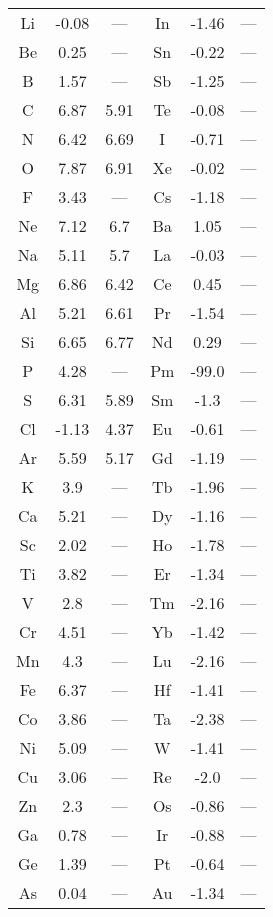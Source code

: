 \begin{table}
  \centering
  \begin{tabular}{c|cc||c|cc}
  Li & -0.08 & --- & In & -1.46 & --- \\
  Be & 0.25 & --- & Sn & -0.22 & --- \\
  B & 1.57 & --- & Sb & -1.25 & --- \\
  C & 6.87 & 5.91 & Te & -0.08 & --- \\
  N & 6.42 & 6.69 & I & -0.71 & --- \\
  O & 7.87 & 6.91 & Xe & -0.02 & --- \\
  F & 3.43 & --- & Cs & -1.18 & --- \\
  Ne & 7.12 & 6.7 & Ba & 1.05 & --- \\
  Na & 5.11 & 5.7 & La & -0.03 & --- \\
  Mg & 6.86 & 6.42 & Ce & 0.45 & --- \\
  Al & 5.21 & 6.61 & Pr & -1.54 & --- \\
  Si & 6.65 & 6.77 & Nd & 0.29 & --- \\
  P & 4.28 & --- & Pm & -99.0 & --- \\
  S & 6.31 & 5.89 & Sm & -1.3 & --- \\
  Cl & -1.13 & 4.37 & Eu & -0.61 & --- \\
  Ar & 5.59 & 5.17 & Gd & -1.19 & --- \\
  K & 3.9 & --- & Tb & -1.96 & --- \\
  Ca & 5.21 & --- & Dy & -1.16 & --- \\
  Sc & 2.02 & --- & Ho & -1.78 & --- \\
  Ti & 3.82 & --- & Er & -1.34 & --- \\
  V & 2.8 & --- & Tm & -2.16 & --- \\
  Cr & 4.51 & --- & Yb & -1.42 & --- \\
  Mn & 4.3 & --- & Lu & -2.16 & --- \\
  Fe & 6.37 & --- & Hf & -1.41 & --- \\
  Co & 3.86 & --- & Ta & -2.38 & --- \\
  Ni & 5.09 & --- & W & -1.41 & --- \\
  Cu & 3.06 & --- & Re & -2.0 & --- \\
  Zn & 2.3 & --- & Os & -0.86 & --- \\
  Ga & 0.78 & --- & Ir & -0.88 & --- \\
  Ge & 1.39 & --- & Pt & -0.64 & --- \\
  As & 0.04 & --- & Au & -1.34 & --- \\

\end{tabular}
\end{table}
